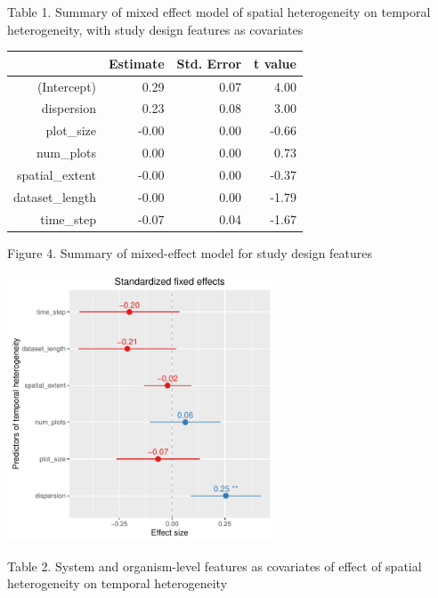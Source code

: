 \documentclass[11pt]{article}
\begin{document}
Table 1. Summary of mixed effect model of spatial heterogeneity on temporal heterogeneity, with study design features as covariates

\FloatBarrier
\begin{table}[ht]
\centering
\begin{tabular}{rrrr}
  \hline
 & Estimate & Std. Error & t value \\ 
  \hline
(Intercept) & 0.29 & 0.07 & 4.00 \\ 
  dispersion & 0.23 & 0.08 & 3.00 \\ 
  plot\_size & -0.00 & 0.00 & -0.66 \\ 
  num\_plots & 0.00 & 0.00 & 0.73 \\ 
  spatial\_extent & -0.00 & 0.00 & -0.37 \\ 
  dataset\_length & -0.00 & 0.00 & -1.79 \\ 
  time\_step & -0.07 & 0.04 & -1.67 \\ 
   \hline
\end{tabular}
\end{table}
\FloatBarrier



Figure 4. Summary of mixed-effect model for study design features 

\includegraphics[width=300px]{designmodel}
\pagebreak


Table 2. System and organism-level features as covariates of effect of spatial heterogeneity on temporal heterogeneity
\end{document}

